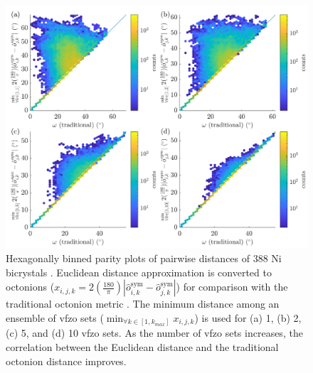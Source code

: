 \documentclass[final,twocolumn,12pt]{elsarticle}
\begin{document}
\begin{figure}
    \centering
    \includegraphics[scale=1]{figures/dist-ensemble-k1-2-5-10.png}
    \caption{Hexagonally binned parity plots of pairwise distances of 388 Ni bicrystals \cite{olmstedSurveyComputedGrain2009a}. Euclidean distance approximation is converted to octonions ($x_{i,j,k}=2\left(\frac{180}{\pi}\right)|\hat{o}_{i,k}^{\text{sym}}-\hat{o}_{j,k}^{\text{sym}}|$) for comparison with the traditional octonion metric \cite{chesserLearningGrainBoundary2020}. The minimum distance among an ensemble of \gls{vfzo} sets ($\min_{\forall k \in [1,k_{max}]}x_{i,j,k}$) is used for (a) 1, (b) 2, (c) 5, and (d) 10 \gls{vfzo} sets. As the number of \gls{vfzo} sets increases, the correlation between the Euclidean distance and the traditional octonion distance improves.}
    \label{fig:dist-ensemble-k1-2-5-10}
\end{figure}
\end{document}
